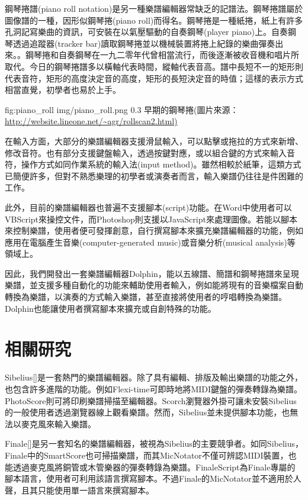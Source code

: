 \documentclass[12pt,a4paper,oneside]{report}
\begin{document}
鋼琴捲譜(piano roll notation)是另一種樂譜編輯器常缺乏的記譜法。鋼琴捲譜屬於圖像譜的一種，因形似鋼琴捲(piano roll)而得名。鋼琴捲是一種紙捲，紙上有許多孔洞記寫樂曲的資訊，可安裝在以氣壓驅動的自奏鋼琴(player piano)上。自奏鋼琴透過追蹤器(tracker bar)讀取鋼琴捲並以機械裝置將捲上紀錄的樂曲彈奏出來。。鋼琴捲和自奏鋼琴在一九二零年代曾相當流行，而後逐漸被收音機和唱片所取代\cite{thePiano}。今日的鋼琴捲譜多以橫軸代表時間，縱軸代表音高。譜中長短不一的矩形則代表音符，矩形的高度決定音的高度，矩形的長短決定音的時值；這樣的表示方式相當直覺，初學者也易於上手。

\figurewithcaption
{fig:piano_roll}
{img/piano_roll.png}
{0.3}
{早期的鋼琴捲(圖片來源：\url{http://website.lineone.net/~agr/rollscan2.html)}}

在輸入方面，大部分的樂譜編輯器支援滑鼠輸入，可以點擊或拖拉的方式來新增、修改音符。也有部分支援鍵盤輸入，透過按鍵對應，或以組合鍵的方式來輸入音符，操作方式如同作業系統的輸入法(input method)。雖然相較於紙筆，這類方式已簡便許多，但對不熟悉樂理的初學者或演奏者而言，輸入樂譜仍往往是件困難的工作。

此外，目前的樂譜編輯器也普遍不支援腳本(script)功能。在Word中使用者可以VBScript來操控文件，而Photoshop則支援以JavaScript來處理圖像。若能以腳本來控制樂譜，使用者便可發揮創意，自行撰寫腳本來擴充樂譜編輯器的功能，例如應用在電腦產生音樂(computer-generated music)或音樂分析(musical analysis)等領域上。

因此，我們開發出一套樂譜編輯器Dolphin，能以五線譜、簡譜和鋼琴捲譜來呈現樂譜，並支援多種自動化的功能來輔助使用者輸入，例如能將現有的音樂檔案自動轉換為樂譜，以演奏的方式輸入樂譜，甚至直接將使用者的哼唱轉換為樂譜。Dolphin也能讓使用者撰寫腳本來擴充或自創特殊的功能。

\section{相關研究}

Sibelius[]是一套熱門的樂譜編輯器。除了具有編輯、排版及輸出樂譜的功能之外，也包含許多進階的功能。例如Flexi-time可即時地將MIDI鍵盤的彈奏轉錄為樂譜。PhotoScore則可將印刷樂譜掃描至編輯器。Scorch瀏覽器外掛可讓未安裝Sibelius的一般使用者透過瀏覽器線上觀看樂譜。然而，Sibelius並未提供腳本功能，也無法以麥克風來輸入樂譜。

Finale[]是另一套知名的樂譜編輯器，被視為Sibelius的主要競爭者。如同Sibelius，Finale中的SmartScore也可掃描樂譜，而其MicNotator不僅可辨認MIDI裝置，也能透過麥克風將銅管或木管樂器的彈奏轉錄為樂譜。FinaleScript為Finale專屬的腳本語言，使用者可利用該語言撰寫腳本。不過Finale的MicNotator並不適用於人聲，且其只能使用單一語言來撰寫腳本。
\end{document}
